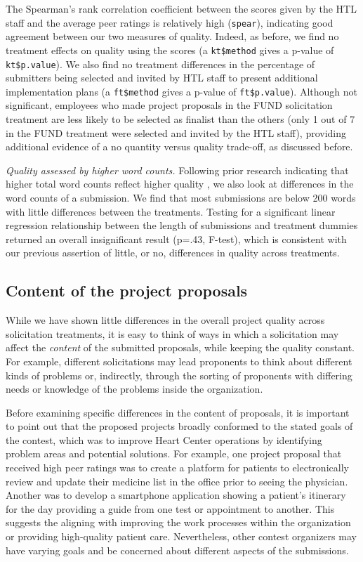 \documentclass[11pt, titlepage]{article}
\begin{document}
The Spearman's rank correlation coefficient between the scores given by
the HTL staff and the average peer ratings is relatively high
(\texttt{spear}), indicating good agreement between our two measures of
quality. Indeed, as before, we find no treatment effects on quality
using the scores (a \texttt{kt\$method} gives a p-value of
\texttt{kt\$p.value}). We also find no treatment differences in the
percentage of submitters being selected and invited by HTL staff to
present additional implementation plans (a \texttt{ft\$method} gives a
p-value of \texttt{ft\$p.value}). Although not significant, employees
who made project proposals in the FUND solicitation treatment are less
likely to be selected as finalist than the others (only 1 out of 7 in
the FUND treatment were selected and invited by the HTL staff),
providing additional evidence of a no quantity versus quality trade-off,
as discussed before.

\emph{Quality assessed by higher word counts.} Following prior research
indicating that higher total word counts reflect higher quality
\citep{blumenstock2008size}, we also look at differences in the word
counts of a submission. We find that most submissions are below 200
words with little differences between the treatments. Testing for a
significant linear regression relationship between the length of
submissions and treatment dummies returned an overall insignificant
result (p=.43, F-test), which is consistent with our previous assertion
of little, or no, differences in quality across treatments.

\subsection{Content of the project
proposals}\label{content-of-the-project-proposals}

While we have shown little differences in the overall project quality
across solicitation treatments, it is easy to think of ways in which a
solicitation may affect the \emph{content} of the submitted proposals,
while keeping the quality constant. For example, different solicitations
may lead proponents to think about different kinds of problems or,
indirectly, through the sorting of proponents with differing needs or
knowledge of the problems inside the organization.

Before examining specific differences in the content of proposals, it is
important to point out that the proposed projects broadly conformed to
the stated goals of the contest, which was to improve Heart Center
operations by identifying problem areas and potential solutions. For
example, one project proposal that received high peer ratings was to
create a platform for patients to electronically review and update their
medicine list in the office prior to seeing the physician. Another was
to develop a smartphone application showing a patient's itinerary for
the day providing a guide from one test or appointment to another. This
suggests the aligning with improving the work processes within the
organization or providing high-quality patient care. Nevertheless, other
contest organizers may have varying goals and be concerned about
different aspects of the submissions.
\end{document}
